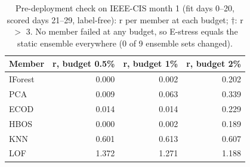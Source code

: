 \begin{table}[t]
\centering
\small
\caption{Pre-deployment check on IEEE-CIS month 1 (fit days 0--20, scored days 21--29, label-free): r per member at each budget; $\dagger$: r $>$ 3. No member failed at any budget, so E-stress equals the static ensemble everywhere (0 of 9 ensemble sets changed).}
\label{tab:pre-deployment}
\begin{tabular}{lrrr}
\toprule
Member & r, budget 0.5\% & r, budget 1\% & r, budget 2\% \\
\midrule
IForest & 0.000 & 0.002 & 0.202 \\
PCA & 0.009 & 0.063 & 0.339 \\
ECOD & 0.014 & 0.014 & 0.229 \\
HBOS & 0.000 & 0.002 & 0.189 \\
KNN & 0.601 & 0.613 & 0.607 \\
LOF & 1.372 & 1.271 & 1.188 \\
\bottomrule
\end{tabular}
\end{table}
